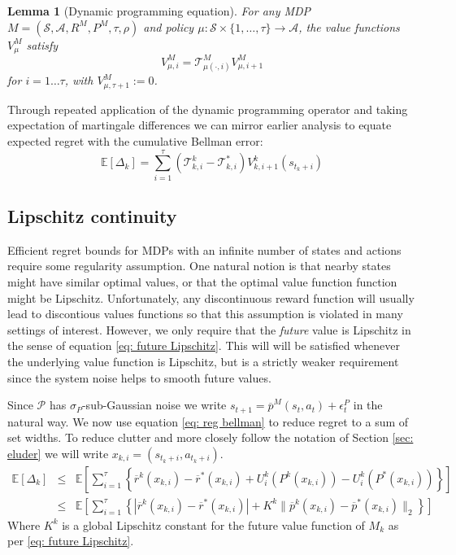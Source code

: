 \documentclass{article}
\newtheorem{lemma}{Lemma}
\newcommand{\Exp}{\mathds{E}}
\newcommand{\Pc}{\mathcal{P}}
\newcommand{\Sc}{\mathcal{S}}
\newcommand{\Ac}{\mathcal{A}}
\newcommand{\Tc}{\mathcal{T}}
\begin{document}
\begin{lemma}[Dynamic programming equation]
\label{lem: DPl} \hspace{0.000000001mm} \newline
For any MDP $M = (\Sc, \Ac, R^M, P^M, \tau, \rho)$ and policy $\mu:\Sc \times \{1,\ldots,\tau\} \rightarrow \Ac$, the value functions $V^M_\mu$ satisfy
\begin{equation}\label{eq: DP}
V_{\mu,i}^{M} = \mathcal{T}_{\mu(\cdot,i)}^M V_{\mu,i+1}^M
\end{equation}
for $i=1\dots \tau$, with $V_{\mu,\tau+1}^{M} := 0$.
\end{lemma}

Through repeated application of the dynamic programming operator and taking expectation of martingale differences we can mirror earlier analysis \cite{osband2013more} to equate expected regret with the cumulative Bellman error:
\begin{equation}
\label{eq: reg bellman}
	\Exp [ \Delta_k ] = \sum_{i=1}^\tau (\Tc^k_{k,i}-\Tc^*_{k,i})V^k_{k,i+1}(s_{t_k+i})
\end{equation}


\subsection{Lipschitz continuity}
\label{sec: lipschitz}
Efficient regret bounds for MDPs with an infinite number of states and actions require some regularity assumption.
One natural notion is that nearby states might have similar optimal values, or that the optimal value function function might be Lipschitz.
Unfortunately, any discontinuous reward function will usually lead to discontious values functions so that this assumption is violated in many settings of interest.
However, we only require that the \emph{future} value is Lipschitz in the sense of equation \eqref{eq: future Lipschitz}.
This will will be satisfied whenever the underlying value function is Lipschitz, but is a strictly weaker requirement since the system noise helps to smooth future values.

Since $\Pc$ has $\sigma_P$-sub-Gaussian noise we write $s_{t+1} = \overline{p}^M(s_t,a_t)+\epsilon^P_t$ in the natural way.
We now use equation \eqref{eq: reg bellman} to reduce regret to a sum of set widths.
To reduce clutter and more closely follow the notation of Section \ref{sec: eluder} we will write $x_{k,i}=(s_{t_k+i},a_{t_k+i})$.
\begin{eqnarray}
	\Exp [ \Delta_k ] &\le& \Exp \left[ \sum_{i=1}^\tau \left\{  \overline{r}^k(x_{k,i}) - \overline{r}^*(x_{k,i})
	+  U^k_{i}(P^k(x_{k,i})) - U^k_{i}(P^*(x_{k,i})) \right\} \right] \nonumber \\
	&\le& \Exp\left[ \sum_{i=1}^\tau \left\{ | \overline{r}^k(x_{k,i}) - \overline{r}^*(x_{k,i})|
	+ K^k \|\overline{p}^k(x_{k,i}) - \overline{p}^*(x_{k,i}) \|_2 \right\}\right]
\end{eqnarray}
Where $K^k$ is a global Lipschitz constant for the future value function of $M_k$ as per \eqref{eq: future Lipschitz}.
\end{document}

